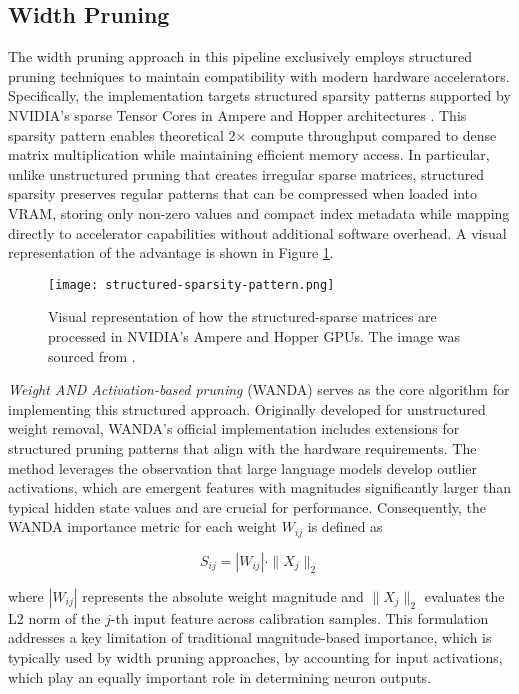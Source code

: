 \subsection{Width Pruning} \label{wanda}

The width pruning approach in this pipeline exclusively employs structured pruning techniques to maintain compatibility with modern hardware accelerators. Specifically, the implementation targets structured sparsity patterns supported by NVIDIA's sparse Tensor Cores in Ampere and Hopper architectures \cite{nvidia-width}. This sparsity pattern enables theoretical 2$\times$ compute throughput compared to dense matrix multiplication while maintaining efficient memory access. In particular, unlike unstructured pruning that creates irregular sparse matrices, structured sparsity preserves regular patterns that can be compressed when loaded into VRAM, storing only non-zero values and compact index metadata while mapping directly to accelerator capabilities without additional software overhead. A visual representation of the advantage is shown in Figure \ref{fig:nvidia-width}.

\begin{figure}[htbp]
    \centering
    \texttt{[image: structured-sparsity-pattern.png]}
    \caption[Advantages of Structured Sparsity]{Visual representation of how the structured-sparse matrices are processed in NVIDIA's Ampere and Hopper GPUs. The image was sourced from \cite{nvidia-width}.}
    \label{fig:nvidia-width}
\end{figure}

\textit{Weight AND Activation-based pruning} (WANDA) \cite{wanda} serves as the core algorithm for implementing this structured approach. Originally developed for unstructured weight removal, WANDA's official implementation includes extensions for structured pruning patterns that align with the hardware requirements. The method leverages the observation that large language models develop outlier activations, which are emergent features with magnitudes significantly larger than typical hidden state values and are crucial for performance. Consequently, the WANDA importance metric for each weight $W_{ij}$ is defined as

\begin{equation}
S_{ij} = |W_{ij}| \cdot \|X_j\|_2
\end{equation}

where $|W_{ij}|$ represents the absolute weight magnitude and $\|X_j\|_2$ evaluates the L2 norm of the $j$-th input feature across calibration samples. This formulation addresses a key limitation of traditional magnitude-based importance, which is typically used by width pruning approaches, by accounting for input activations, which play an equally important role in determining neuron outputs.

